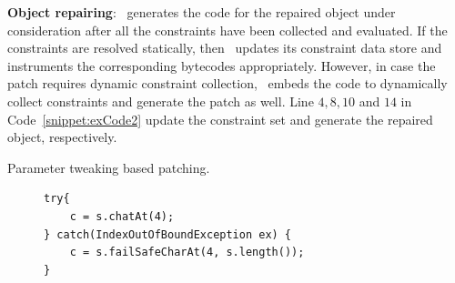 \begin{mylist}

 \item \textbf{Object repairing}: \tool\ generates the code for the repaired
object under consideration after all the constraints have been collected and
evaluated. If the constraints are resolved statically, then \tool\ updates its
constraint data store and instruments the corresponding bytecodes appropriately.
However, in case the patch requires dynamic constraint collection, \tool\ embeds
the code to dynamically collect constraints and generate the patch as well. Line
$4, 8, 10$ and $14$ in Code~\ref{snippet:exCode2} update the constraint set and
generate the repaired object, respectively.

\begin{algorithm}[t]
\scriptsize
\DontPrintSemicolon
{}
\caption{Parameter tweaking based  patching.}
\label{algo:stringPatchParametr}
\end{algorithm}

\lstset{language=Java, caption=Example of parameter tweaking.,
label =
snippet:exCode3, firstnumber =1}
\begin{figure}[t]
\begin{lstlisting}
try{
    c = s.chatAt(4);
} catch(IndexOutOfBoundException ex) {
    c = s.failSafeCharAt(4, s.length());
}
\end{lstlisting}
\end{figure}


\end{mylist}
